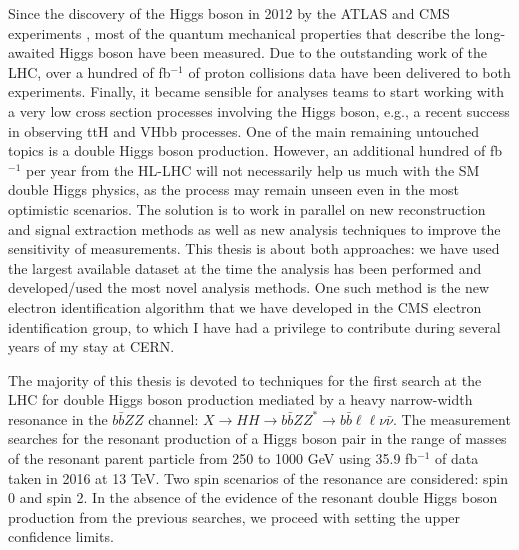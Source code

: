 Since the discovery of the Higgs boson in 2012 by the ATLAS and CMS experiments%
, most of the quantum mechanical properties that describe the long-awaited Higgs boson have been measured. Due to the outstanding work of the LHC, over a hundred of fb$^{-1}$ of proton collisions data have been delivered to both experiments. Finally, it became sensible for analyses teams to start working with a very low cross section processes involving the Higgs boson, e.g., a recent success in observing ttH and VHbb processes. One of the main remaining untouched topics is a double Higgs boson production. However, an additional hundred of fb$^{-1}$ per year from the HL-LHC will not necessarily help us much with the SM double Higgs physics, as the process may remain unseen even in the most optimistic scenarios. The solution is to work in parallel on new reconstruction and signal extraction methods as well as new analysis techniques to improve the sensitivity of measurements. This thesis is about both approaches: we have used the largest available dataset at the time the analysis has been performed and developed/used the most novel analysis methods. One such method is the new electron identification algorithm that we have developed in the CMS electron identification group, to which I have had a privilege to contribute during several years of my stay at CERN.

The majority of this thesis is devoted to techniques for the first search at the LHC for double Higgs boson production mediated by a heavy narrow-width resonance in the $b\bar{b}ZZ$ channel:  $X \to HH \to b\bar{b}ZZ^{*} \to b\bar{b} \ell\ell\nu \bar{\nu}$. The measurement searches for the resonant production of a Higgs boson pair in the range of masses of the resonant parent particle from 250 to 1000 GeV using 35.9 fb$^{-1}$ of data taken in 2016 at 13 TeV. Two spin scenarios of the resonance are considered: spin 0 and spin 2. In the absence of the evidence of the resonant double Higgs boson production from the previous searches, we proceed with setting the upper confidence limits. %